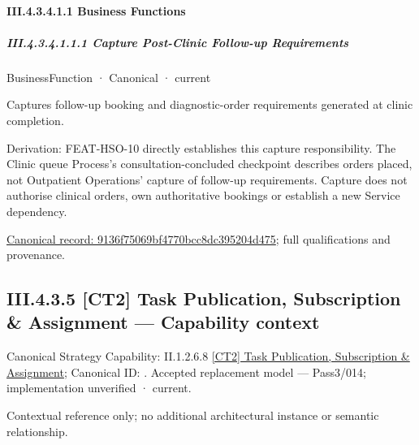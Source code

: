\paragraph*{III.4.3.4.1.1 Business Functions}
\label{navigation:III.4.3.4.1.1}

\subparagraph*{III.4.3.4.1.1.1 Capture Post-Clinic Follow-up Requirements}
\label{navigation:III.4.3.4.1.1.1}

\label{element:9136f75069bf4770bcc8dc395204d475}
{\small BusinessFunction · Canonical · current}\par

Captures follow-up booking and diagnostic-order requirements generated at clinic completion.



Derivation: FEAT-HSO-10 directly establishes this capture responsibility. The Clinic queue Process's consultation-concluded checkpoint describes orders placed, not Outpatient Operations' capture of follow-up requirements. Capture does not authorise clinical orders, own authoritative bookings or establish a new Service dependency.


{\footnotesize \href{../../../../../../../../continuum/business/business-function/9136f75069bf4770bcc8dc395204d475.md}{Canonical record: 9136f75069bf4770bcc8dc395204d475}; full qualifications and provenance.}\par
\subsection*{III.4.3.5 [CT2] Task Publication, Subscription \& Assignment — Capability context}
\label{navigation:III.4.3.5}

{\small Canonical Strategy Capability: II.1.2.6.8 \hyperref[element:f41e5bfc2b5845bbbb3290ecf8b57892]{[CT2] Task Publication, Subscription \& Assignment}; Canonical ID: \texttt{}. Accepted replacement model — Pass3/014; implementation unverified · current.}\par
Contextual reference only; no additional architectural instance or semantic relationship.\par
